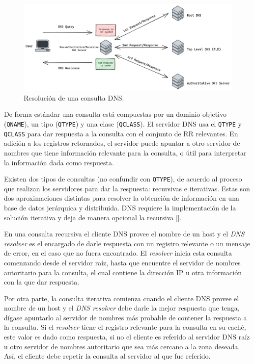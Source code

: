 \begin{figure}[!ht]
    \centering
    \includegraphics[width=\linewidth]{draws/dns-query.png}
    \caption{Resolución de una consulta DNS.}
\end{figure}

De forma estándar una consulta está compuestas por un dominio objetivo (\verb|QNAME|), un tipo (\verb|QTYPE|) y una clase (\verb|QCLASS|). El servidor DNS usa el \verb|QTYPE| y \verb|QCLASS| para dar respuesta a la consulta con el conjunto de RR relevantes. En adición a los registros retornados, el servidor puede apuntar a otro servidor de nombres que tiene información relevante para la consulta, o útil para interpretar la información dada como respuesta.

Existen dos tipos de consultas (no confundir con \verb|QTYPE|), de acuerdo al proceso que realizan los servidores para dar la respuesta: recursivas e iterativas. Estas son dos aproximaciones distintas para resolver la obtención de información en una base de datos jerárquica y distribuida. DNS requiere la implementación de la solución iterativa y deja de manera opcional la recursiva [\cite{rfc_1034}].

En una consulta recursiva el cliente DNS provee el nombre de un host y el \textit{DNS resolver} es el encargado de darle respuesta con un registro relevante o un mensaje de error, en el caso que no fuera encontrado. El \textit{resolver} inicia esta consulta comenzando desde el servidor raíz, hasta que encuentre el servidor de nombres autoritario para la consulta, el cual contiene la dirección IP u otra información con la que dar respuesta.

Por otra parte, la consulta iterativa comienza cuando el cliente DNS provee el nombre de un host y el \textit{DNS resolver} debe darle la mejor respuesta que tenga, dígase apuntarlo al servidor de nombres más probable de contener la respuesta a la consulta. Si el \textit{resolver} tiene el registro relevante para la consulta en su caché, este valor es dado como respuesta, si no el cliente es referido al servidor DNS raíz u otro servidor de nombres autoritario que sea más cercano a la zona deseada. Así, el cliente debe repetir la consulta al servidor al que fue referido.


